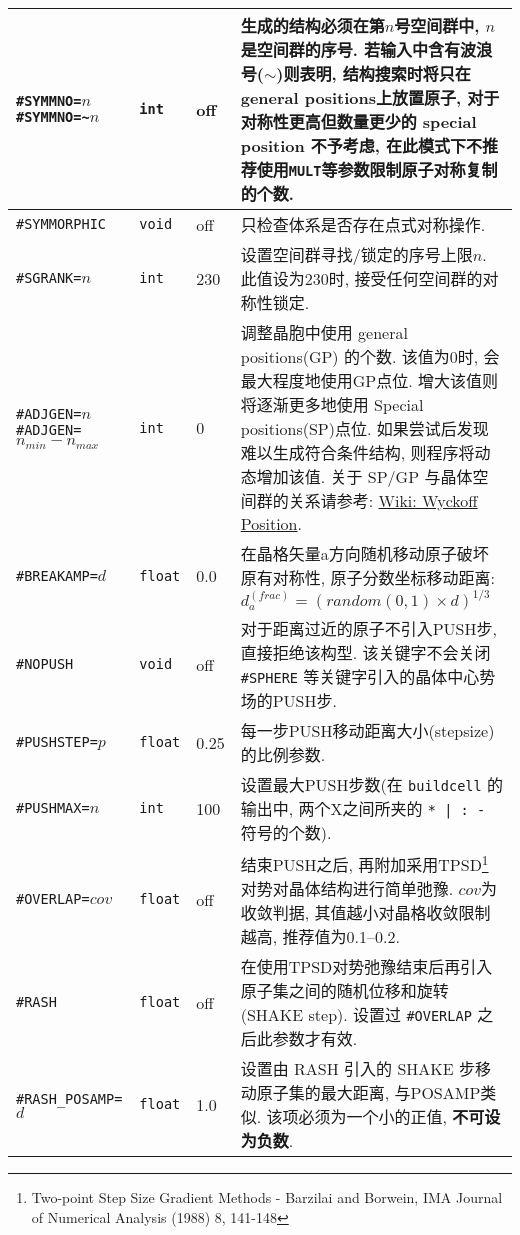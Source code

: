 \documentclass[a4paper, 10pt]{article}
\begin{document}
\begin{center}
\begin{longtable}{m{11em}|m{4em}<{\centering}|m{3em}<{\centering}|m{15em}}
\midrule
\verb|#SYMMNO=|\(n\)\hspace{6em} \verb|#SYMMNO=~|\(n\) & \verb|int| & off & 生成的结构必须在第\(n\)号空间群中, \(n\)是空间群的序号. 若输入中含有波浪号(\(\sim\))则表明, 结构搜索时将只在general positions上放置原子, 对于对称性更高但数量更少的 special position 不予考虑, 在此模式下不推荐使用\verb|MULT|等参数限制原子对称复制的个数.\\
\midrule
\verb|#SYMMORPHIC| & \verb|void| & off & 只检查体系是否存在点式对称操作.\\
\midrule
\verb|#SGRANK=|\(n\) & \verb|int| & 230 & 设置空间群寻找/锁定的序号上限\(n\). 此值设为230时, 接受任何空间群的对称性锁定.\\
\midrule
\verb|#ADJGEN=|\(n\)\hspace{4em}\verb|#ADJGEN=|\(n_{min}-n_{max}\)  & \verb|int|  & 0 & 调整晶胞中使用 general positions(GP) 的个数. 该值为0时, 会最大程度地使用GP点位. 增大该值则将逐渐更多地使用 Special positions(SP)点位. 如果尝试后发现难以生成符合条件结构, 则程序将动态增加该值. 关于 SP/GP 与晶体空间群的关系请参考: \href{https://en.wikipedia.org/wiki/Wyckoff_positions}{Wiki: Wyckoff Position}.\\
\midrule
\verb|#BREAKAMP=|\(d\) & \verb|float| & 0.0 & 在晶格矢量a方向随机移动原子破坏原有对称性, 原子分数坐标移动距离: \(d^{(frac)}_a=(random(0,1)\times{}d)^{1/3}\)\\
\midrule
\verb|#NOPUSH|& \verb|void| & off & 对于距离过近的原子不引入PUSH步, 直接拒绝该构型. 该关键字不会关闭 \verb|#SPHERE| 等关键字引入的晶体中心势场的PUSH步.\\
\midrule
\verb|#PUSHSTEP=|\(p\)& \verb|float| & 0.25 & 每一步PUSH移动距离大小(stepsize)的比例参数.\\
\midrule
\verb|#PUSHMAX=|\(n\)& \verb|int| & 100 &设置最大PUSH步数(在 \verb|buildcell| 的输出中, 两个X之间所夹的 \verb!* | : -! 符号的个数).\\
\midrule
\verb|#OVERLAP=|\(cov\)& \verb|float| & off & 结束PUSH之后, 再附加采用TPSD\footnote{Two-point Step Size Gradient Methods - Barzilai and Borwein, IMA Journal of Numerical Analysis (1988) 8, 141-148}对势对晶体结构进行简单弛豫. \(cov\)为收敛判据, 其值越小对晶格收敛限制越高, 推荐值为0.1--0.2.\\
\midrule
\verb|#RASH|& \verb|float| & off & 在使用TPSD对势弛豫结束后再引入原子集之间的随机位移和旋转(SHAKE step). 设置过 \verb|#OVERLAP| 之后此参数才有效.\\
\midrule
\verb|#RASH_POSAMP=|\(d\)& \verb|float| & 1.0 & 设置由 RASH 引入的 SHAKE 步移动原子集的最大距离, 与POSAMP类似. 该项必须为一个小的正值, \textbf{不可设为负数}.\\

\end{longtable}
\end{center}
\end{document}

